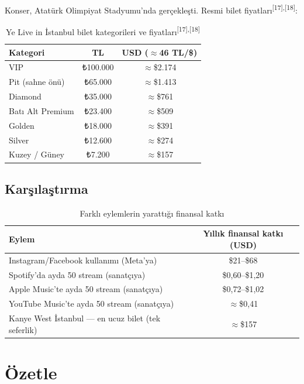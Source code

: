 \documentclass{article}
\begin{document}
Konser, Atatürk Olimpiyat Stadyumu'nda gerçekleşti. Resmi bilet fiyatları\textsuperscript{[17],[18]}:

\begin{table}[h]
\centering
\begin{tabular}{lcc}
\toprule
\textbf{Kategori} & \textbf{TL} & \textbf{USD ($\approx$46 TL/\$)} \\
\midrule
VIP              & ₺100.000 & $\approx$\$2.174 \\
Pit (sahne önü)  & ₺65.000  & $\approx$\$1.413 \\
Diamond          & ₺35.000  & $\approx$\$761  \\
Batı Alt Premium & ₺23.400  & $\approx$\$509  \\
Golden           & ₺18.000  & $\approx$\$391  \\
Silver           & ₺12.600  & $\approx$\$274  \\
Kuzey / Güney    & ₺7.200   & $\approx$\$157  \\
\bottomrule
\end{tabular}
\caption{Ye Live in İstanbul bilet kategorileri ve fiyatları\textsuperscript{[17],[18]}}
\end{table}

\subsection*{Karşılaştırma}

\begin{table}[h]
\centering
\begin{tabular}{lc}
\toprule
\textbf{Eylem} & \textbf{Yıllık finansal katkı (USD)} \\
\midrule
Instagram/Facebook kullanımı (Meta'ya)               & \$21--\$68 \\
Spotify'da ayda 50 stream (sanatçıya)                & \$0,60--\$1,20 \\
Apple Music'te ayda 50 stream (sanatçıya)            & \$0,72--\$1,02 \\
YouTube Music'te ayda 50 stream (sanatçıya)          & $\approx$\$0,41 \\
Kanye West İstanbul --- en ucuz bilet (tek seferlik) & $\approx$\$157 \\
\bottomrule
\end{tabular}
\caption{Farklı eylemlerin yarattığı finansal katkı}
\end{table}

\section*{Özetle}
\end{document}
